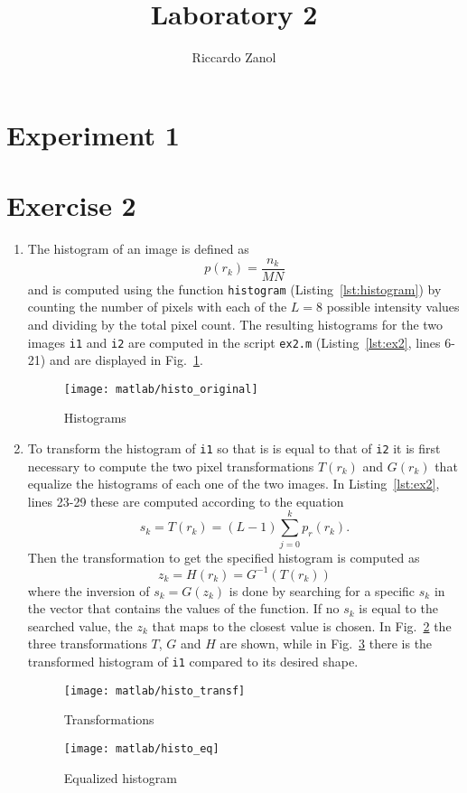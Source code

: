 \documentclass{article}
\author{Riccardo Zanol}
\title{Laboratory 2}
\newcommand{\includecode}[1]{}
\newcommand{\inlinecode}[1]{\lstinline[basicstyle=\ttfamily,keywordstyle={}]{#1}}
\begin{document}
\maketitle
\section*{Experiment 1}
\section*{Exercise 2}
\begin{enumerate}
\item The histogram of an image is defined as
  \[ p(r_k) = \frac{n_k}{MN} \]
  and is computed using the function \inlinecode{histogram}
  (Listing~\ref{lst:histogram}) by counting the number of pixels with
  each of the $L=8$ possible intensity values and dividing by the
  total pixel count. The resulting histograms for the two images
  \inlinecode{i1} and \inlinecode{i2} are computed in the script
  \inlinecode{ex2.m} (Listing~\ref{lst:ex2}, lines 6-21) and are displayed in
  Fig.~\ref{plot:histo_original}.
  \begin{figure}[h]
    \centering
    \texttt{[image: matlab/histo\_original]}
    \caption{Histograms}
    \label{plot:histo_original}
  \end{figure}
\item To transform the histogram of \inlinecode{i1} so that is is
  equal to that of \inlinecode{i2} it is first necessary to compute
  the two pixel transformations $T(r_k)$ and $G(r_k)$ that equalize
  the histograms of each one of the two images. In
  Listing~\ref{lst:ex2}, lines 23-29 these are computed according to
  the equation
  \[ s_k = T(r_k) = (L-1)\sum_{j=0}^kp_r(r_k) . \]
  Then the transformation to get the specified histogram is computed as
  \[ z_k = H(r_k) = G^{-1}(T(r_k)) \]
  where the inversion of $s_k = G(z_k)$ is done by searching for a
  specific $s_k$ in the vector that contains the values of the
  function. If no $s_k$ is equal to the searched value, the $z_k$ that
  maps to the closest value is chosen. In Fig.~\ref{plot:histo_transf}
  the three transformations $T$, $G$ and $H$ are shown, while in
  Fig.~\ref{plot:histo_eq} there is the transformed histogram of
  \inlinecode{i1} compared to its desired shape.
  \begin{figure}[h]
    \centering
    \texttt{[image: matlab/histo\_transf]}
    \caption{Transformations}
    \label{plot:histo_transf}
  \end{figure}
  \begin{figure}[h]
    \centering
    \texttt{[image: matlab/histo\_eq]}
    \caption{Equalized histogram}
    \label{plot:histo_eq}
  \end{figure}  
\end{enumerate}
\includecode{ex2}
\includecode{histogram}
\end{document}
